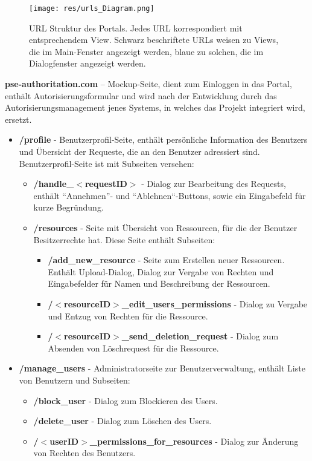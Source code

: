 \documentclass[parskip=full,11pt]{scrartcl}
\renewcommand{\labelitemii}{$\circ$}
\begin{document}
\begin{figure}[ht!]
 	\centering
 	\texttt{[image: res/urls\_Diagram.png]}
 	\caption{URL Struktur des Portals. Jedes URL korrespondiert mit entsprechendem View. Schwarz beschriftete URLs weisen zu Views, die im Main-Fenster angezeigt werden, blaue zu solchen, die im Dialogfenster angezeigt werden.}
 	\label{URL-Struktur}
 \end{figure}
 
\textbf{pse-authoritation.com} – Mockup-Seite, dient zum Einloggen in das Portal, enthält Autorisierungsformular und wird nach der Entwicklung durch das Autorisierungsmanagement jenes Systems, in welches das Projekt integriert wird, ersetzt. 
 
\renewcommand{\labelitemi}{$\bullet$}
\renewcommand{\labelitemii}{$\bullet$}
\renewcommand{\labelitemiii}{$\bullet$}
\begin{itemize}[itemsep=0pt]
\item \textbf{/profile} - Benutzerprofil-Seite, enthält persönliche Information des Benutzers und Übersicht der Requeste, die an den Benutzer adressiert sind.\\

Benutzerprofil-Seite ist mit Subseiten versehen:
\begin{itemize}[itemsep=0pt]
\item \textbf{/handle{\_}$<$requestID$>$} - Dialog zur Bearbeitung des Requests, enthält ``Annehmen''- und ``Ablehnen``-Buttons, sowie ein Eingabefeld für kurze Begründung.
\item \textbf{/resources} - Seite mit Übersicht von Ressourcen, für die der Benutzer Besitzerrechte hat. Diese Seite enthält Subseiten:
\begin{itemize}[itemsep=0pt]
\item \textbf{/add{\_}new{\_}resource} - Seite zum Erstellen neuer Ressourcen. Enthält Upload-Dialog, Dialog zur Vergabe von Rechten und Eingabefelder für Namen und Beschreibung der Ressourcen.
\item \textbf{/$<$resourceID$>${\_}edit{\_}users{\_}permissions} - Dialog zu Vergabe und Entzug von Rechten für die Ressource.
\item \textbf{/$<$resourceID$>${\_}send{\_}deletion{\_}request} - Dialog zum Absenden von Löschrequest für die Ressource.
\end{itemize}
\end{itemize}


\item \textbf{/manage{\_}users} - Administratorseite zur Benutzerverwaltung, enthält Liste von Benutzern und Subseiten:
\begin{itemize}[itemsep=0pt]
\item \textbf{/block{\_}user} - Dialog zum Blockieren des Users.
\item \textbf{/delete{\_}user} - Dialog zum Löschen des Users.
\item \textbf{/$<$userID$>${\_}permissions{\_}for{\_}resources} - Dialog zur Änderung von Rechten des Benutzers.
\end{itemize}


\end{itemize}
\end{document}
